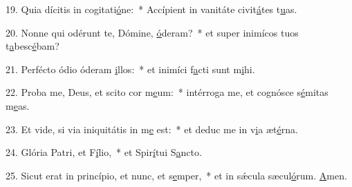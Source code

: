 19. Quia dícitis in cogitati\uline{ó}ne:~* Accípient in vanitáte civit\uline{á}tes t\uline{u}as.\par 
20. Nonne qui odérunt te, Dómine, \uline{ó}deram?~* et super inimícos tuos t\uline{a}besc\uline{é}bam?\par 
21. Perfécto ódio óderam \uline{i}llos:~* et inimíci f\uline{a}cti sunt m\uline{i}hi.\par 
22. Proba me, Deus, et scito cor m\uline{e}um:~* intérroga me, et cognósce s\uline{é}mitas m\uline{e}as.\par 
23. Et vide, si via iniquitátis in m\uline{e} est:~* et deduc me in v\uline{i}a æt\uline{é}rna.\par 
24. Glória Patri, et F\uline{í}lio,~* et Spir\uline{í}tui S\uline{a}ncto.\par 
25. Sicut erat in princípio, et nunc, et s\uline{e}mper,~* et in sǽcula sæcul\uline{ó}rum. \uline{A}men.\par 
